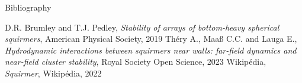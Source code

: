 \documentclass{beamer}
\begin{document}
\begin{frame}{Bibliography}
    \begin{thebibliography}{3}
         D.R. Brumley and T.J. Pedley, \emph{Stability of arrays of bottom-heavy spherical squirmers}, American Physical Society, 2019
         Théry A., Maaß C.C. and Lauga E., \emph{Hydrodynamic interactions between squirmers near walls: far-field dynamics and near-field cluster stability}, Royal Society Open Science, 2023
         Wikipédia, \emph{Squirmer}, Wikipédia, 2022
    \end{thebibliography}
\end{frame}
\end{document}
